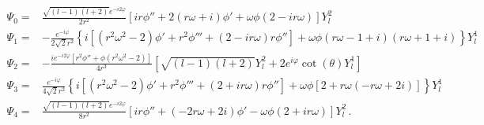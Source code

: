 \documentclass{brownthesis}
\begin{document}
\begin{align*}
\Psi_{0}= & \frac{\sqrt{(l-1)(l+2)}e^{-i2\varphi}}{2r^{2}}\left[ir\phi''+2(r\omega+i)\phi'+\omega\phi(2-ir\omega)\right]Y_{l}^{2}\\
\Psi_{1}= & -\frac{e^{-i\varphi}}{2\sqrt{2}r^{2}}\left\{i\left[\left(r^{2}\omega^{2}-2\right)\phi'+r^2\phi'''+(2-ir\omega)r\phi''\right]+\omega\phi(r\omega-1+i)(r\omega+1+i)\right\}Y_{l}^{1}\\
\Psi_{2}= & -\frac{ie^{-i2\varphi}\left[r^{2}\phi''+\phi\left(r^{2}\omega^{2}-2\right)\right]}{4r^{3}}\left[\sqrt{(l-1)(l+2)}Y_{l}^{2}+2e^{i\varphi}\cot(\theta)Y_{l}^{1}\right]\\
\Psi_{3}= & \frac{e^{-i\varphi}}{4\sqrt{2}r^{2}}\left\{i\left[\left(r^{2}\omega^{2}-2\right)\phi'+r^2\phi'''+(2+ir\omega)r\phi''\right]+\omega\phi[2+r\omega(-r\omega+2i)]\right\}Y_{l}^{1}\\
\Psi_{4}= & \frac{\sqrt{(l-1)(l+2)}e^{-i2\varphi}}{8r^{2}}\left[ir\phi''+(-2r\omega+2i)\phi'-\omega\phi(2+ir\omega)\right]Y_{l}^{2}\,.
\end{align*}



\end{document}
